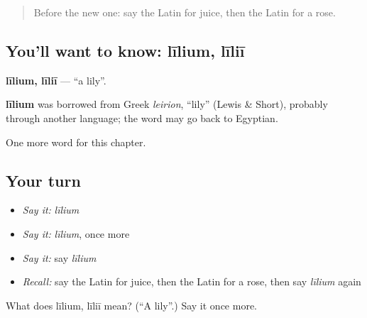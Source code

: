 \label{lesson:LA-C128-lilium}



\begin{quote}
Before the new one: say the Latin for juice, then the Latin for a rose.
\end{quote}

\subsection*{You'll want to know: līlium, līliī}
\textbf{līlium, līliī} — \textquotedblleft{}a lily\textquotedblright{}.

\begin{cousinweb}
\textbf{līlium} was borrowed from Greek \emph{leirion}, \textquotedblleft{}lily\textquotedblright{} (Lewis \& Short), probably through another language; the word may go back to Egyptian.
\end{cousinweb}

\begin{grammarlens}[title={What you've built}]
One more word for this chapter.
\end{grammarlens}

\subsection*{Your turn}
\begin{itemize}
\raggedright
  \item \emph{Say it:} \emph{līlium}
  \item \emph{Say it:} \emph{līlium}, once more
  \item \emph{Say it:} say \emph{līlium}
  \item \emph{Recall:} say the Latin for juice, then the Latin for a rose, then say \emph{līlium} again
\end{itemize}

\begin{tcolorbox}[breakable,colback=teal!4,colframe=teal!35!black,title={Before you move on}]
What does līlium, līliī mean? (\textquotedblleft{}A lily\textquotedblright{}.) Say it once more.
\end{tcolorbox}
